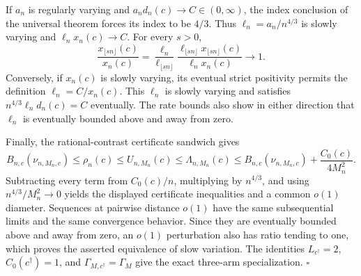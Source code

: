 If \(a_n\) is regularly varying and \(a_nd_n(c)\to C\in(0,\infty)\), the index conclusion of the universal theorem forces its index to be \(4/3\).  Thus \(\ell_n=a_n/n^{4/3}\) is slowly varying and \(\ell_nx_n(c)\to C\).  For every \(s>0\),
\[
 \frac{x_{\lfloor sn\rfloor}(c)}{x_n(c)}
 =\frac{\ell_n}{\ell_{\lfloor sn\rfloor}}
 \frac{\ell_{\lfloor sn\rfloor}x_{\lfloor sn\rfloor}(c)}
 {\ell_nx_n(c)}\longrightarrow1.
\]
Conversely, if \(x_n(c)\) is slowly varying, its eventual strict positivity permits the definition \(\ell_n=C/x_n(c)\).  This \(\ell_n\) is slowly varying and satisfies \(n^{4/3}\ell_nd_n(c)=C\) eventually.  The rate bounds also show in either direction that \(\ell_n\) is eventually bounded above and away from zero.

Finally, the rational-contrast certificate sandwich gives
\[
 B_{n,c}(\nu_{n,M_n,c})\leq\rho_n(c)\leq U_{n,M_n}(c)
 \leq\Lambda_{n,M_n}(c)
 \leq B_{n,c}(\nu_{n,M_n,c})+\frac{C_0(c)}{4M_n^2}.
\]
Subtracting every term from \(C_0(c)/n\), multiplying by \(n^{4/3}\), and using \(n^{4/3}/M_n^2\to0\) yields the displayed certificate inequalities and a common \(o(1)\) diameter.  Sequences at pairwise distance \(o(1)\) have the same subsequential limits and the same convergence behavior.  Since they are eventually bounded above and away from zero, an \(o(1)\) perturbation also has ratio tending to one, which proves the asserted equivalence of slow variation.  The identities \(L_{c^\dagger}=2\), \(C_0(c^\dagger)=1\), and \(\Gamma_{M,c^\dagger}=\Gamma_M\) give the exact three-arm specialization. \(\square\)